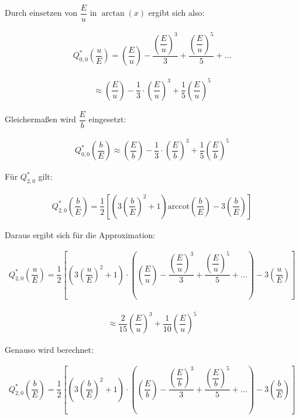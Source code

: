 Durch einsetzen von $\dfrac{E}{u}$ in $\arctan(x)$ ergibt sich also: 

\begin{align*}
Q_{0,0}^{*} \left(\dfrac{u}{E}\right) = \left(\dfrac{E}{u}\right)- \dfrac{\left(\dfrac{E}{u}\right)^3}{3}+ \dfrac{\left(\dfrac{E}{u}\right)^5}{5} + ...
\end{align*}

\begin{align*}
\approx \left(\dfrac{E}{u}\right) - \dfrac{1}{3} \cdot \left(\dfrac{E}{u}\right)^3 + \dfrac{1}{5} \left(\dfrac{E}{u}\right)^5 
\end{align*}

Gleichermaßen wird $\dfrac{E}{b}$ eingesetzt:

\begin{align*}
Q_{0,0}^{*} \left(\dfrac{b}{E}\right) \approx \left(\dfrac{E}{b}\right) - \dfrac{1}{3} \cdot \left(\dfrac{E}{b}\right)^3 + \dfrac{1}{5} \left(\dfrac{E}{b}\right)^5
\end{align*}

Für $Q_{2,0}^{*}$ gilt: 

\begin{align*}
Q_{2,0}^{*}\left(\dfrac{b}{E}\right) = \dfrac{1}{2} \left[\left(3 \left(\dfrac{b}{E}\right)^2+1\right) \text{arccot} \left(\dfrac{b}{E}\right)-3 \left(\dfrac{b}{E}\right)\right]
\end{align*}

Daraus ergibt sich für die Approximation: 

\begin{align*}
Q_{2,0}^{*}\left(\dfrac{u}{E}\right) = \dfrac{1}{2} \left[\left(3 \left(\dfrac{u}{E}\right)^2+1\right) \cdot \left(\left(\dfrac{E}{u}\right)-\dfrac{\left(\dfrac{E}{u}\right)^3}{3}+\dfrac{\left(\dfrac{E}{u}\right)^5}{5}+...\right)-3 \left(\dfrac{u}{E}\right)\right]
\end{align*}

\begin{align*}
\approx \dfrac{2}{15} \left(\dfrac{E}{u}\right)^3 + \dfrac{1}{10} \left(\dfrac{E}{u}\right)^5
\end{align*}

Genauso wird berechnet: 

\begin{align*}
Q_{2,0}^{*}\left(\dfrac{b}{E}\right) = \dfrac{1}{2} \left[\left(3 \left(\dfrac{b}{E}\right)^2+1\right) \cdot \left(\left(\dfrac{E}{b}\right)-\dfrac{\left(\dfrac{E}{b}\right)^3}{3}+\dfrac{\left(\dfrac{E}{b}\right)^5}{5}+...\right)-3 \left(\dfrac{b}{E}\right)\right]
\end{align*}

